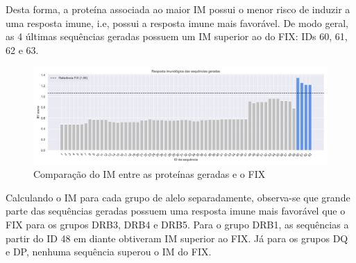 Desta forma, a proteína associada ao maior IM possui o menor risco de induzir a uma resposta imune, i.e,
possui a resposta imune mais favorável. 
De modo geral, as 4 últimas sequências geradas possuem um IM superior ao do FIX: IDs 60, 61, 62 e 63.

\begin{figure}[H]
    \centering
    \includegraphics[width=.9\linewidth]{figuras/plot_imuno_IMscore_geral.png}    
    \caption{Comparação do IM entre as proteínas geradas e o FIX}
    \label{fig:immuno_tscore}
\end{figure}

Calculando o IM para cada grupo de alelo separadamente, observa-se que grande parte das sequências geradas possuem uma resposta 
imune mais favorável que o FIX para os grupos DRB3, DRB4 e DRB5. 
Para o grupo DRB1, as sequências a partir do ID 48 em diante obtiveram IM superior ao FIX. 
Já para os grupos DQ e DP, nenhuma sequência superou o IM do FIX. 

